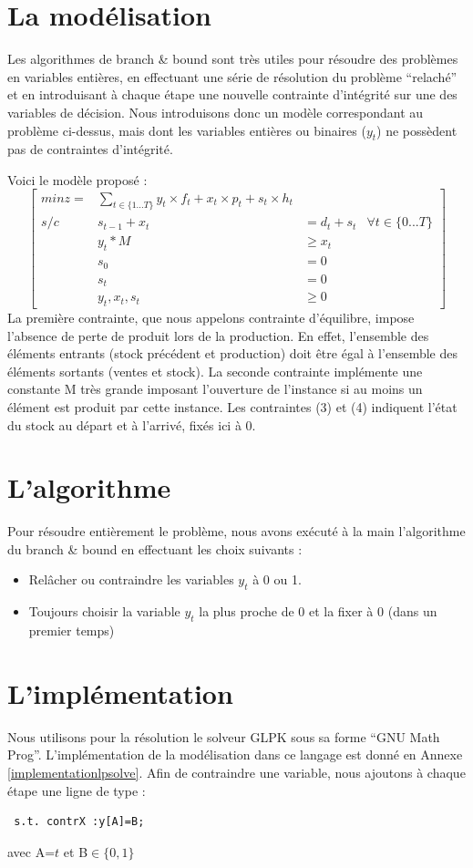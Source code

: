 \documentclass[a4paper,11pt,twoside]{report}
\begin{document}
\section{La modélisation}
Les algorithmes de branch \& bound sont très utiles pour résoudre des problèmes en variables entières, en effectuant une série de résolution du problème ``relaché'' et en introduisant à chaque étape une nouvelle contrainte d'intégrité sur une des variables de décision.
Nous introduisons donc un modèle correspondant au problème ci-dessus, mais dont les variables entières ou binaires ($y_t$) ne possèdent pas de contraintes d’intégrité.

Voici le modèle proposé :
\[
 \left[ \begin{matrix}
         min z= & \displaystyle \sum_{t\in \{1...T\}} y_t \times f_t + x_t \times p_t + s_t \times h_t \\
         s/c & s_{t-1}+x_{t}& =d_t+s_t & \forall t\in \{0...T\} \\
         & y_t*M &\geq x_t \\
         &s_0&=0\\
         &s_t&=0\\
         &y_t,x_t,s_t&\geq 0
        \end{matrix}
 \right]
\]
La première contrainte, que nous appelons contrainte d'équilibre, impose l'absence de perte de produit lors de la production. En effet, l'ensemble des éléments entrants (stock précédent et production) doit être égal à l'ensemble des éléments sortants (ventes et stock).
La seconde contrainte implémente une constante M très grande imposant l'ouverture de l'instance si au moins un élément est produit par cette instance.
Les contraintes (3) et (4) indiquent l'état du stock au départ et à l'arrivé, fixés ici à 0.
\newpage
\section{L'algorithme}
Pour résoudre entièrement le problème, nous avons exécuté à la main l'algorithme du branch \& bound en effectuant les choix suivants :
\begin{itemize}
 \item Relâcher ou contraindre les variables $y_t$ à 0 ou 1.
 \item Toujours choisir la variable $y_t$ la plus proche de 0 et la fixer à 0 (dans un premier temps)
\end{itemize}

\section{L'implémentation}
Nous utilisons pour la résolution le solveur GLPK sous sa forme ``GNU Math Prog''. L'implémentation de la modélisation dans ce langage est donné en Annexe \ref{implementationlpsolve}.
Afin de contraindre une variable, nous ajoutons à chaque étape une ligne de type :
\begin{verbatim}
 s.t. contrX :y[A]=B;
\end{verbatim}
 avec A=$t$ et B$\in \{0,1\}$
 
\end{document}

